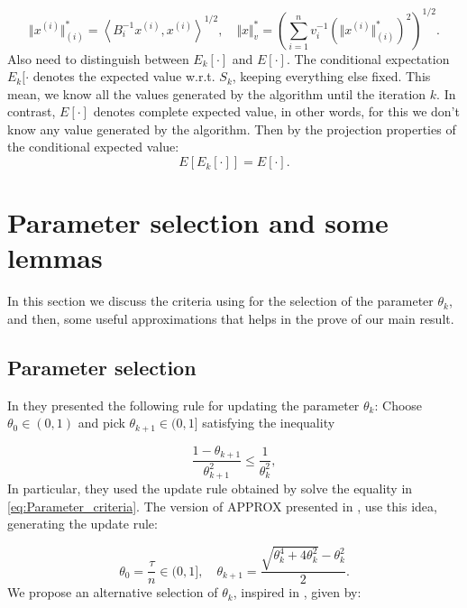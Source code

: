\documentclass{article}
\begin{document}
\begin{equation}
	\Vert x^{(i)}\Vert_{(i)}^* = \left<B_i^{-1}x^{(i)},x^{(i)}\right>^{1/2},\quad \Vert x\Vert_v^* = \left( \sum_{i=1}^n v_i^{-1} \left( \Vert x^{(i)}\Vert_{(i)}^* \right)^2 \right)^{1/2}.
\end{equation}
Also need to distinguish between $E_k[\cdot]$ and $E[\cdot]$. The conditional expectation $E_k[\cdot$ denotes the expected value w.r.t. $S_k$, keeping everything else fixed. This mean,  we know all the values generated by the algorithm until the iteration $k$. In contrast, $E[\cdot]$ denotes complete expected value, in other words, for this we don't know any value generated by the algorithm. Then by the projection properties of the conditional expected value:
\begin{equation*}
	E[E_k[\cdot]] = E[\cdot].
\end{equation*}




\section{Parameter selection and some lemmas}

In this section we discuss the criteria using for the selection of the parameter $\theta_k$, and then,  some useful approximations that helps in the prove of our main result.

\subsection*{Parameter selection}

In \cite{tseng2008accelerated} they presented the following rule for updating the parameter $\theta_k$: Choose $\theta_0 \in (0,1)$ and pick $\theta_{k+1} \in (0,1]$ satisfying the inequality

\begin{equation}
\label{eq:Parameter_criteria}
	\frac{1-\theta_{k+1}}{\theta_{k+1}^2} \leq \frac{1}{\theta_k^2},
\end{equation}
In particular, they used the update rule obtained by solve  the equality in \eqref{eq:Parameter_criteria}.    The version of APPROX presented in \cite{Fercoq_Richtarik}, use this idea, generating the update rule:

\begin{equation*}
	\theta_0 = \frac{\tau}{n} \in (0,1], \quad \theta_{k+1} = \frac{\sqrt{\theta_k^4+4\theta_k^2}-\theta_k^2}{2}.
\end{equation*}
We propose an alternative selection of $\theta_k$, inspired in \cite{HA_JP}, given by:
\end{document}
